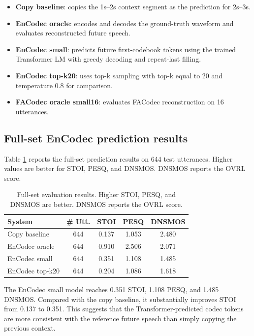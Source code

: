 \documentclass{article}
\begin{document}
	\begin{itemize}
		\item \textbf{Copy baseline}: copies the 1s--2s context segment as the prediction for 2s--3s.
		\item \textbf{EnCodec oracle}: encodes and decodes the ground-truth waveform and evaluates reconstructed future speech.
		\item \textbf{EnCodec small}: predicts future first-codebook tokens using the trained Transformer LM with greedy decoding and repeat-last filling.
		\item \textbf{EnCodec top-k20}: uses top-k sampling with top-k equal to 20 and temperature 0.8 for comparison.
		\item \textbf{FACodec oracle small16}: evaluates FACodec reconstruction on 16 utterances.
	\end{itemize}
	
	\subsection{Full-set EnCodec prediction results}
	
	Table \ref{tab:full_results} reports the full-set prediction results on 644 test utterances. Higher values are better for STOI, PESQ, and DNSMOS. DNSMOS reports the OVRL score.
	
	\begin{table}[t]
		\centering
		\caption{Full-set evaluation results. Higher STOI, PESQ, and DNSMOS are better. DNSMOS reports the OVRL score.}
		\label{tab:full_results}
		\small
		\begin{tabular}{lcccc}
			\toprule
			\textbf{System} & \textbf{\# Utt.} & \textbf{STOI} & \textbf{PESQ} & \textbf{DNSMOS} \\
			\midrule
			Copy baseline & 644 & 0.137 & 1.053 & 2.480 \\
			EnCodec oracle & 644 & 0.910 & 2.506 & 2.071 \\
			EnCodec small & 644 & 0.351 & 1.108 & 1.485 \\
			EnCodec top-k20 & 644 & 0.204 & 1.086 & 1.618 \\
			\bottomrule
		\end{tabular}
	\end{table}
	
	The EnCodec small model reaches 0.351 STOI, 1.108 PESQ, and 1.485 DNSMOS. Compared with the copy baseline, it substantially improves STOI from 0.137 to 0.351. This suggests that the Transformer-predicted codec tokens are more consistent with the reference future speech than simply copying the previous context.
	
\end{document}
